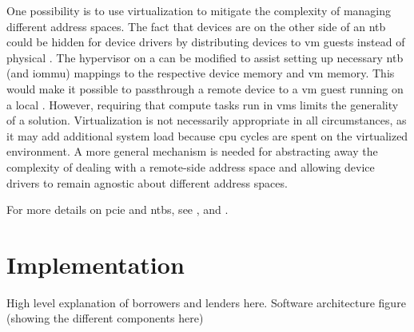 One possibility is to use virtualization to mitigate the complexity of managing different address spaces.
%
The fact that devices are on the other side of an \gls{ntb} could be hidden for device drivers by distributing devices to \gls{vm} \glspl{guest} instead of physical .
%
The \gls{hypervisor} on a  can be modified to assist setting up necessary \gls{ntb} (and \gls{iommu}) mappings to the respective device memory and \gls{vm} memory.
%
This would make it possible to \gls{passthrough} a remote device to a \gls{vm} \gls{guest} running on a local .
%
However, requiring that compute tasks run in \glspl{vm} limits the generality of a solution.
%
Virtualization is not necessarily appropriate in all circumstances, as it may add additional system load because \gls{cpu} cycles are spent on  the virtualized environment.
%
A more general mechanism is needed for abstracting away the complexity of dealing with a remote-side address space and allowing device drivers to remain agnostic about different address spaces.



For more details on \gls{pcie} and \glspl{ntb}, see , and .




\section{Implementation}\label{sec:impl}



High level explanation of borrowers and lenders here.
Software architecture figure (showing the different components here)

